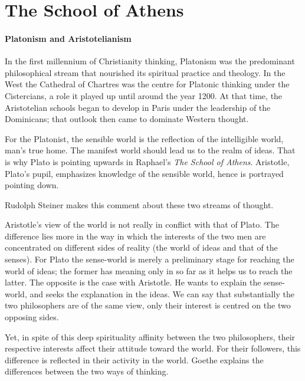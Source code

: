 \section{The School of Athens}

\paragraph{Platonism and Aristotelianism}

In the first millennium of Christianity thinking, Platonism was the predominant philosophical stream that nourished its spiritual practice and theology. In the West the Cathedral of Chartres was the centre for Platonic thinking under the Cistercians, a role it played up until around the year 1200. At that time, the Aristotelian schools began to develop in Paris under the leadership of the Dominicans; that outlook then came to dominate Western thought.

For the Platonist, the sensible world is the reflection of the intelligible world, man's true home. The manifest world should lead us to the realm of ideas. That is why Plato is pointing upwards in Raphael's \emph{The School of Athens}. Aristotle, Plato's pupil, emphasizes knowledge of the sensible world, hence is portrayed pointing down.

Rudolph Steiner makes this comment about these two streams of thought.

\begin{quotex}
Aristotle's view of the world is not really in conflict with that of Plato. The difference lies more in the way in which the interests of the two men are concentrated on different sides of reality (the world of ideas and that of the senses). For Plato the sense-world is merely a preliminary stage for reaching the world of ideas; the former has meaning only in so far as it helps us to reach the latter. The opposite is the case with Aristotle. He wants to explain the sense-world, and seeks the explanation in the ideas. We can say that substantially the two philosophers are of the same view, only their interest is centred on the two opposing sides. 

\end{quotex}
Yet, in spite of this deep spirituality affinity between the two philosophers, their respective interests affect their attitude toward the world. For their followers, this difference is reflected in their activity in the world. Goethe explains the differences between the two ways of thinking.

